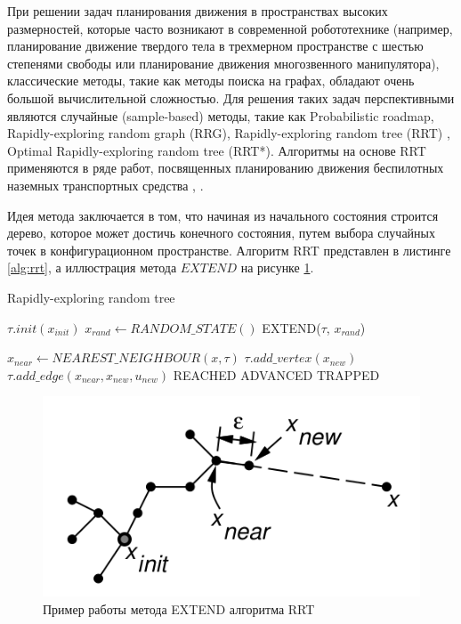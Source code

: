 При решении задач планирования движения в пространствах высоких размерностей, которые часто возникают в современной
робототехнике (например, планирование движение твердого тела в трехмерном пространстве с шестью степенями свободы или
планирование движения многозвенного манипулятора), классические методы, такие как методы поиска на графах, обладают
очень большой вычислительной сложностью. Для решения таких задач перспективными являются случайные (sample-based) методы,
такие как Probabilistic roadmap, Rapidly-exploring random graph (RRG), Rapidly-exploring random tree (RRT)
\cite{motion_planning_rrt}, Optimal Rapidly-exploring random tree (RRT*)\cite{motion_planning_rrt_star}.
Алгоритмы на основе RRT применяются в ряде работ, посвященных планированию движения беспилотных наземных транспортных
средства \cite{motion_planning_rrt_mod_for_car}, \cite{darpa_mit}.

Идея метода заключается в том, что начиная из начального состояния строится дерево, которое может достичь конечного
состояния, путем выбора случайных точек в конфигурационном пространстве. Алгоритм RRT представлен в листинге
\ref{alg:rrt}, а иллюстрация метода $EXTEND$ на рисунке \ref{img:rrt_extend}.

\begin{algorithm}
    \caption{ Rapidly-exploring random tree }
    \label{alg:rrt}
    \begin{algorithmic}

            $\tau.init(x_{init})$
                \State $x_{rand} \leftarrow RANDOM\_STATE()$
                \State EXTEND($\tau$, $x_{rand}$)
            \EndFor
        \EndFunction

            $x_{near} \leftarrow NEAREST\_NEIGHBOUR(x, \tau)$
                \State $\tau.add\_vertex(x_{new})$
                \State $\tau.add\_edge(x_{near}, x_{new}, u_{new})$
                    \State \Return REACHED
                \Else
                    \State \Return ADVANCED
                \EndIf
            \EndIf
            \Return TRAPPED
        \EndFunction
    \end{algorithmic}
\end{algorithm}

\begin{figure}[h]
    \centering
    \includegraphics[]{images/rrt_extend}
    \caption{Пример работы метода EXTEND алгоритма RRT}
    \label{img:rrt_extend}
\end{figure}

